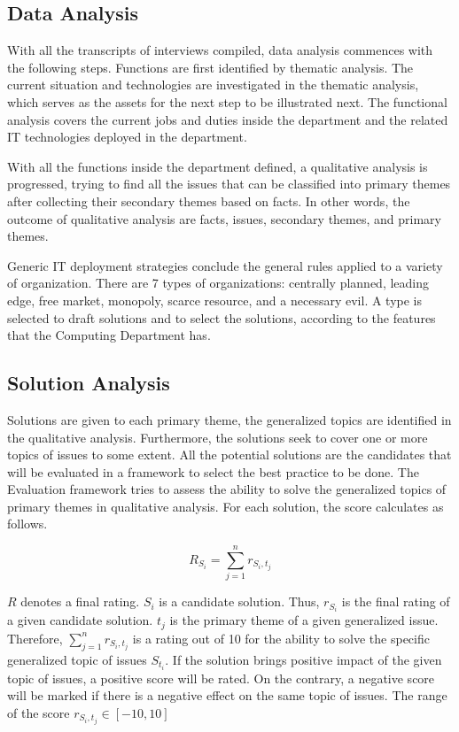 \subsection{Data Analysis}
With all the transcripts of interviews compiled, data analysis commences with the following steps. 
Functions are first identified by thematic analysis. The current situation and technologies are investigated in the thematic analysis, which serves as the assets for the next step to be illustrated next. The functional analysis covers the current jobs and duties inside the department and the related IT technologies deployed in the department.

With all the functions inside the department defined, a qualitative analysis is progressed, trying to find all the issues that can be classified into primary themes after collecting their secondary themes based on facts. In other words, the outcome of qualitative analysis are facts, issues, secondary themes, and primary themes.

Generic IT deployment strategies conclude the general rules applied to a variety of organization. There are 7 types of organizations: centrally planned, leading edge, free market, monopoly, scarce resource, and a necessary evil. A type is selected to draft solutions and to select the solutions, according to the features that the Computing Department has.

\subsection{Solution Analysis}
Solutions are given to each primary theme, the generalized topics are identified in the qualitative analysis. Furthermore, the solutions seek to cover one or more topics of issues to some extent. All the potential solutions are the candidates that will be evaluated in a framework to select the best practice to be done.
The Evaluation framework tries to assess the ability to solve the generalized topics of primary themes in qualitative analysis. For each solution, the score calculates as follows.

$$
R_{S_i} = \sum_{j=1}^n{r_{S_i, t_j}}
\label{eq:score}
$$

$R$ denotes a final rating. $S_i$ is a candidate solution. Thus, $r_{S_i}$ is the final rating of a given candidate solution. $t_j$ is the primary theme of a given generalized issue. Therefore, $\sum_{j=1}^n{r_{S_i, t_j}}$ is a rating out of 10 for the ability to solve the specific generalized topic of issues $S_{t_i}$. If the solution brings positive impact of the given topic of issues, a positive score will be rated. On the contrary, a negative score will be marked if there is a negative effect on the same topic of issues. The range of the score $r_{S_i, t_j} \in [-10, 10]$

